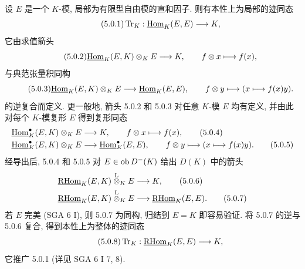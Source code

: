 设 $E$ 是一个 $K$-模, 局部为有限型自由模的直和因子. 则有本性上为局部的迹同态
\begin{equation}\tag{5.0.1}
\operatorname{Tr}_K:\underline{\operatorname{Hom}}_K(E,E)\longrightarrow K,
\end{equation}
它由求值箭头
\begin{equation}\tag{5.0.2}
\underline{\operatorname{Hom}}_K(E,K)\otimes_KE\longrightarrow K,\qquad f\otimes x\longmapsto f(x),
\end{equation}
与典范张量积同构
\begin{equation}\tag{5.0.3}
\underline{\operatorname{Hom}}_K(E,K)\otimes_KE\longrightarrow\underline{\operatorname{Hom}}_K(E,E),\qquad f\otimes y\longmapsto (x\longmapsto f(x)y).
\end{equation}
的逆复合而定义. 更一般地, 箭头 5.0.2 和 5.0.3 对任意 $K$-模 $E$ 均有定义, 并由此对每个 $K$-模复形 $E$ 得到复形同态
\begin{align}
\underline{\operatorname{Hom}}_K^\bullet(E,K)\otimes_KE&\longrightarrow K,\qquad f\otimes x\longmapsto f(x),\tag{5.0.4}\\
\underline{\operatorname{Hom}}_K^\bullet(E,K)\otimes_KE&\longrightarrow \underline{\operatorname{Hom}}_K^\bullet(E,E),\qquad f\otimes y\longmapsto (x\longmapsto f(x)y).\tag{5.0.5}
\end{align}
经导出后, 5.0.4 和 5.0.5 对 $E\in\operatorname{ob} D^-(K)$ 给出 $D(K)$ 中的箭头
\begin{align}
\underline{\mathrm{RHom}}_K(E,K)\overset{\mathrm L}{\otimes}_KE&\longrightarrow K,\tag{5.0.6}\\
\underline{\mathrm{RHom}}_K(E,K)\overset{\mathrm L}{\otimes}_KE&\longrightarrow\underline{\mathrm{RHom}}_K(E,E).\tag{5.0.7}
\end{align}
若 $E$ 完美 (SGA 6 I), 则 5.0.7 为同构, 归结到 $E=K$ 即容易验证. 将 5.0.7 的逆与 5.0.6 复合, 得到本性上为整体的迹同态
\begin{equation}\tag{5.0.8}
\operatorname{Tr}_K:\underline{\mathrm{RHom}}_K(E,E)\longrightarrow K,
\end{equation}
它推广 5.0.1 (详见 SGA 6 I 7, 8).

